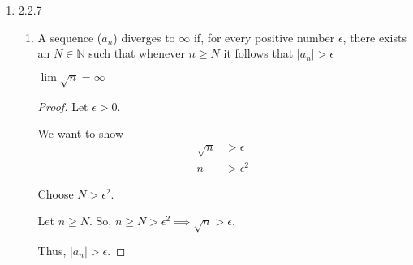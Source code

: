 \documentclass[12pt,letterpaper]{article}
\begin{document}
\begin{enumerate}
\begin{enumerate}
\begin{proof}
            Let $n \ge N$.
            So, $n \ge N > 10 \implies \left \lfloor \frac{10 + n}{2n} \right \rfloor = 0 < \epsilon$.

            Thus, $|a_n - 0| < \epsilon$.
          \end{proof}
      \end{enumerate}

    \item 2.2.7
      \begin{enumerate}
        \item A sequence ($a_n$) diverges to $\infty$ if,
          for every positive number $\epsilon$,
          there exists an $N \in \mathbb{N}$ such that
          whenever $n \ge N$ it follows that $|a_n| > \epsilon$

          $\lim \sqrt{n} = \infty$

          \begin{proof}
            Let $\epsilon > 0$.

            We want to show
            \begin{align*}
              \sqrt{n} &> \epsilon \\
              n &> \epsilon^2
            \end{align*}

            Choose $N > \epsilon^2$.

            Let $n \ge N$.
            So, $n \ge N > \epsilon^2 \implies \sqrt{n} > \epsilon$.

            Thus, $|a_n| > \epsilon$.
          \end{proof}
      \end{enumerate}
  \end{enumerate}
\end{document}
